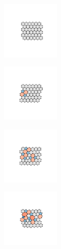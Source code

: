 \begin{figure}[bt]
     \centering
     
     \begin{subfigure}[b]{0.24\textwidth}
    \centering
         \includegraphics[height=2.8cm]{./figures/methods/bs_0.pdf}
         \caption{}
         \label{fig:bsmc1}
     \end{subfigure}
     \hfill
     \begin{subfigure}[b]{0.24\textwidth}
    \centering
         \includegraphics[height=2.8cm]{./figures/methods/bs_1.pdf}
         \caption{}
         \label{fig:bsmc2}
     \end{subfigure}
     \hfill
     \begin{subfigure}[b]{0.24\textwidth}
    \centering
         \includegraphics[height=2.8cm]{./figures/methods/bs_3.pdf}
         \caption{}
         \label{fig:bsmc3}
     \end{subfigure}
     \hfill
     \begin{subfigure}[b]{0.24\textwidth}
    \centering
         \includegraphics[height=2.8cm]{./figures/methods/bs_5.pdf}
         \caption{}
         \label{fig:bsmc4}
     \end{subfigure}
     

\end{figure}
